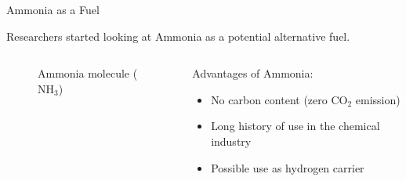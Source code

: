 \begin{frame}{Ammonia as a Fuel}

    Researchers started looking at Ammonia as a potential alternative fuel.

    \vspace{9pt}

    \begin{columns}[c, onlytextwidth]

        \begin{column}{0.45\textwidth}

            \begin{figure}[H]
                \centering

                \LARGE
                \normalsize

                \caption{Ammonia molecule ($\mathrm{NH_3}$)}

            \end{figure}

        \end{column}

        \begin{column}{0.55\textwidth}

            Advantages of Ammonia:

            \begin{itemize}
                \item No carbon content (zero $\mathrm{CO_2}$ emission)
                \item Long history of use in the chemical industry
                \item Possible use as hydrogen carrier
            \end{itemize}

        \end{column}

    \end{columns}

\end{frame}



